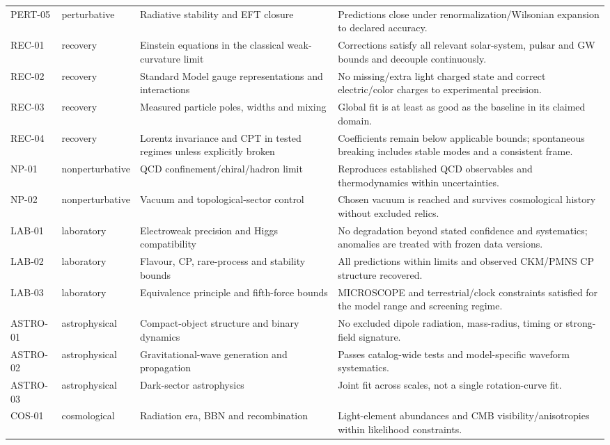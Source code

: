 \begin{longtable}{@{}p{0.9cm}p{1.25cm}p{3.15cm}p{7.7cm}@{}}
PERT-05 & perturbative & Radiative stability and EFT closure & Predictions close under renormalization/Wilsonian expansion to declared accuracy. \\
REC-01 & recovery & Einstein equations in the classical weak-curvature limit & Corrections satisfy all relevant solar-system, pulsar and GW bounds and decouple continuously. \\
REC-02 & recovery & Standard Model gauge representations and interactions & No missing/extra light charged state and correct electric/color charges to experimental precision. \\
REC-03 & recovery & Measured particle poles, widths and mixing & Global fit is at least as good as the baseline in its claimed domain. \\
REC-04 & recovery & Lorentz invariance and CPT in tested regimes unless explicitly broken & Coefficients remain below applicable bounds; spontaneous breaking includes stable modes and a consistent frame. \\
NP-01 & nonperturbative & QCD confinement/chiral/hadron limit & Reproduces established QCD observables and thermodynamics within uncertainties. \\
NP-02 & nonperturbative & Vacuum and topological-sector control & Chosen vacuum is reached and survives cosmological history without excluded relics. \\
LAB-01 & laboratory & Electroweak precision and Higgs compatibility & No degradation beyond stated confidence and systematics; anomalies are treated with frozen data versions. \\
LAB-02 & laboratory & Flavour, CP, rare-process and stability bounds & All predictions within limits and observed CKM/PMNS CP structure recovered. \\
LAB-03 & laboratory & Equivalence principle and fifth-force bounds & MICROSCOPE and terrestrial/clock constraints satisfied for the model range and screening regime. \\
ASTRO-01 & astrophysical & Compact-object structure and binary dynamics & No excluded dipole radiation, mass-radius, timing or strong-field signature. \\
ASTRO-02 & astrophysical & Gravitational-wave generation and propagation & Passes catalog-wide tests and model-specific waveform systematics. \\
ASTRO-03 & astrophysical & Dark-sector astrophysics & Joint fit across scales, not a single rotation-curve fit. \\
COS-01 & cosmological & Radiation era, BBN and recombination & Light-element abundances and CMB visibility/anisotropies within likelihood constraints. \\

\end{longtable}
